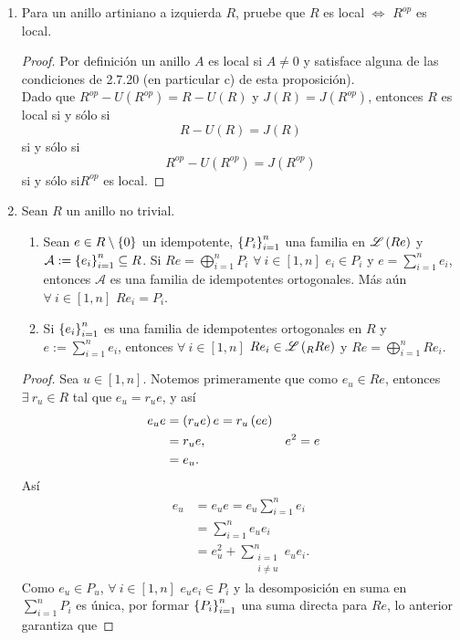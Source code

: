\documentclass{article}
\begin{document}
\begin{enumerate}[label=\textbf{Ej \arabic*.}]
		\item Para un anillo artiniano a izquierda $R$, pruebe que $R$ es local $\iff$ $R^{op}$ es local.
		\begin{proof}
			Por definición un anillo $A$ es local si $A\neq 0$ y satisface alguna de las condiciones de 2.7.20 (en particular c) de esta proposición). \\
			Dado que $R^{op}-U(R^{op})=R-U(R)$ y $J(R)=J(R^{op})$, entonces $R$ es local si y sólo si 
			\[R-U(R)=J(R)\]
			si y sólo si
			\[R^{op}-U(R^{op})=J(R^{op})\]
			si y sólo si\quad  $R^{op}$ es local.
		\end{proof}
		
		\item Sean $R$ un anillo no trivial.
		\begin{enumerate}
			\item Sean $e\in R\setminus\left\{0\right\}$ un idempotente, ${\left\{{P}_{i}\right\}}_{i=1}^{n}$ una familia en $\mathscr{L}\left(Re\right)$ y $\mathcal{A}:={\left\{{e}_{i}\right\}}_{i=1}^{n}\subseteq R$. Si $Re=\bigoplus\limits_{i=1}^n P_i$ $\forall\ i\in[1,n]$ $e_i\in P_i$ y $e=\sum\limits_{i=1}^ne_i$, entonces $\mathcal{A}$ es una familia de idempotentes ortogonales. Más aún $\forall\ i\in[1,n]$ $Re_i=P_i$.
			\item Si ${\left\{{e}_{i}\right\}}_{i=1}^{n}$ es una familia de idempotentes ortogonales en $R$ y $e:=\sum\limits_{i=1}^ne_i$, entonces $\forall\ i\in[1,n]$ $Re_i\in\genlin{\ringmod{R}{Re}{l}}$ y $Re=\bigoplus\limits_{i=1}^n Re_i$.
		\end{enumerate}
		\begin{proof}
			 Sea $u\in[1,n]$. Notemos primeramente que como $e_u\in Re$, entonces $\exists\ r_u\in R$ tal que $e_u=r_ue$, y así
			\begin{align*}
				e_ue&=\left(r_ue\right)e=r_u\left(ee\right)\\
				&=r_ue, && e^2=e\\
				&=e_u.
			\end{align*}
			Así
			\begin{align*}
				e_u&=e_ue=e_u\sum\limits_{i=1}^ne_i\\
				&=\sum\limits_{i=1}^n e_ue_i\\
				&=e_u^2+\sum\limits_{\substack{i=1\\i\neq u}}^n e_ue_i.
			\end{align*}			
			Como $e_u\in P_u$, $\forall\ i\in [1,n]$ $e_ue_i\in P_i$ y la desomposición en suma en $\sum\limits_{i=1}^nP_i$ es única, por formar ${\left\{{P}_{i}\right\}}_{i=1}^{n}$ una suma directa para $Re$, lo anterior garantiza que

\end{proof}
\end{enumerate}
\end{document}
